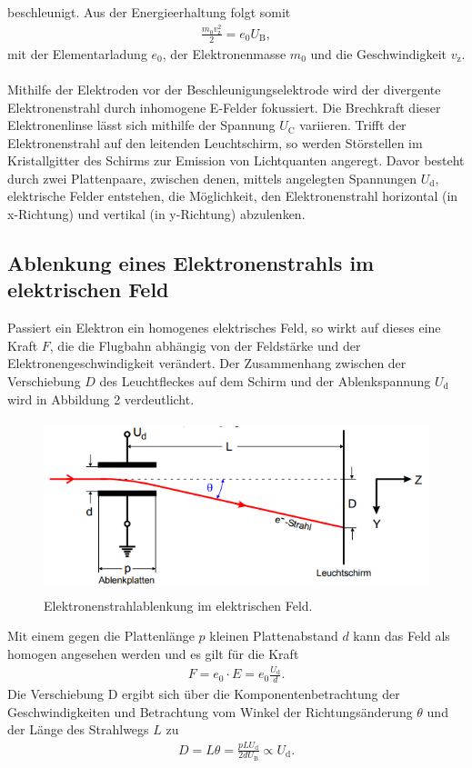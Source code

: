 beschleunigt. Aus der Energieerhaltung folgt somit
\begin{align}
\frac{m_\text{0} v_\text{z}^{2}}{2} = e_\text{0} U_\text{B},
\end{align}
mit der Elementarladung $e_\text{0}$, der Elektronenmasse $m_\text{0}$ und die Geschwindigkeit
$v_\text{z}$. \\~\\
Mithilfe der Elektroden vor der Beschleunigungselektrode wird der divergente Elektronenstrahl 
durch inhomogene E-Felder fokussiert. Die Brechkraft dieser Elektronenlinse lässt sich mithilfe 
der Spannung $U_\text{C}$ variieren. Trifft der Elektronenstrahl auf den leitenden Leuchtschirm, so werden
Störstellen im Kristallgitter des Schirms zur Emission von Lichtquanten angeregt. Davor besteht durch
zwei Plattenpaare, zwischen denen, mittels angelegten Spannungen $U_\text{d}$, elektrische Felder entstehen,
 die Möglichkeit, den Elektronenstrahl horizontal (in x-Richtung) und vertikal (in y-Richtung) abzulenken.

 \subsection{Ablenkung eines Elektronenstrahls im elektrischen Feld}
Passiert ein Elektron ein homogenes elektrisches Feld, so wirkt auf dieses eine Kraft $F$, die die
Flugbahn abhängig von der Feldstärke und der Elektronengeschwindigkeit verändert. 
Der Zusammenhang zwischen der Verschiebung $D$ des Leuchtfleckes auf dem Schirm und der
Ablenkspannung $U_\text{d}$ wird in Abbildung 2 verdeutlicht.
\begin{figure}[H]
  \centering
  \includegraphics[height=5cm]{ablenkung1.png}
  \caption{Elektronenstrahlablenkung im elektrischen Feld. \cite[S.3]{kent}}
\end{figure}
Mit einem gegen die Plattenlänge $p$ kleinen Plattenabstand $d$ kann das Feld als homogen angesehen
werden und es gilt für die Kraft
\begin{align}
F = e_\text{0} \cdot E = e_\text{0} \frac{U_\text{d}}{d}.
\end{align}
Die Verschiebung D ergibt sich über die Komponentenbetrachtung der Geschwindigkeiten und Betrachtung
vom Winkel der Richtungsänderung $\theta$ und der Länge des Strahlwegs $L$  zu
\begin{align}
D = L \theta = \frac{p L U_\text{d}}{2 d U_\text{B}} \propto U_\text{d}.
\end{align}

